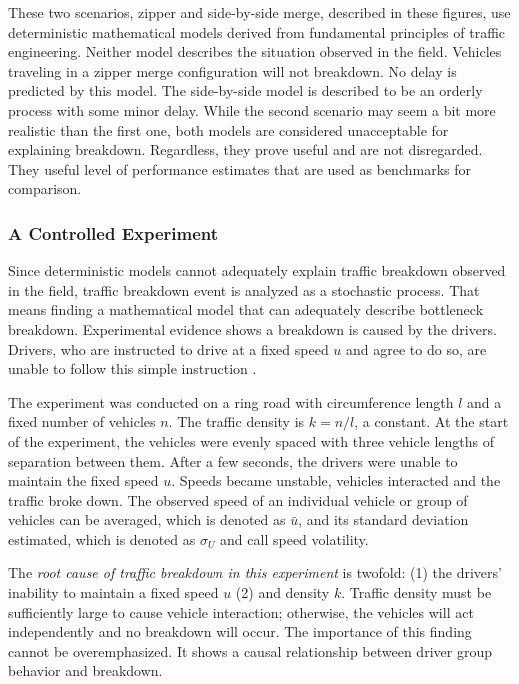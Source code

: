 \documentclass[Proceedings]{ascelike}
\begin{document}
These two scenarios, zipper and side-by-side merge, described in these figures, use deterministic mathematical models derived from fundamental principles of traffic engineering. Neither model describes the situation observed in the field.  Vehicles traveling in a zipper merge configuration will not breakdown. No delay is predicted by this model.    The side-by-side model is described to be  an orderly process with some minor delay. While the second scenario may seem a bit more realistic than the first one, both models are considered unacceptable for explaining breakdown. Regardless, they prove useful and are not disregarded. They useful level of performance estimates that are used as benchmarks for comparison.


\subsubsection{A Controlled Experiment}

Since deterministic models cannot  adequately explain traffic breakdown observed in the field,  traffic breakdown event is analyzed as a stochastic process.   That means finding a  mathematical model that can adequately describe bottleneck breakdown. Experimental evidence shows  a breakdown is caused by  the drivers. Drivers, who are instructed to drive at a fixed speed $u$ and agree to do so, are unable to follow this simple instruction \cite{1367-2630-10-3-033001}. 

The experiment was conducted on a ring  road with circumference length $l$ and  a fixed number of  vehicles  $n$. The traffic density is $k = n/l$, a constant. At the start of the experiment, the vehicles were evenly spaced with three vehicle lengths of separation between them. After a few seconds, the drivers were unable to maintain the fixed speed $u$. Speeds became unstable, vehicles interacted and the traffic broke down.  The observed speed of an individual vehicle or group of vehicles can be averaged, which is denoted as $\bar{u}$, and its standard deviation estimated, which is denoted as $\sigma_U$ and call speed volatility.  

The \emph{root cause of traffic breakdown in this experiment} is twofold: (1) the drivers' inability to maintain  a fixed speed $u$ (2) and density $k$. Traffic density must be sufficiently large to cause vehicle interaction; otherwise, the vehicles will act independently and no breakdown will occur. The importance of this finding cannot be overemphasized. It shows a causal relationship between driver group behavior and breakdown.
\end{document}
